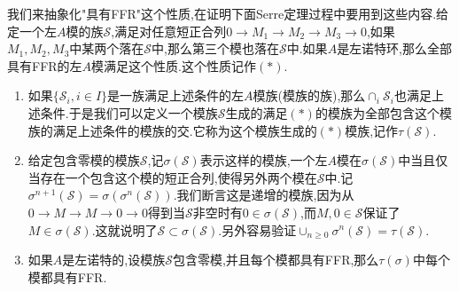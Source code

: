 我们来抽象化"具有FFR"这个性质,在证明下面Serre定理过程中要用到这些内容.给定一个左$A$模的族$\mathscr{S}$,满足对任意短正合列$0\to M_1\to M_2\to M_3\to0$,如果$M_1,M_2,M_3$中某两个落在$\mathscr{S}$中,那么第三个模也落在$\mathscr{S}$中.如果$A$是左诺特环,那么全部具有FFR的左$A$模满足这个性质.这个性质记作$(\ast)$.
\begin{enumerate}
	\item 如果$\{\mathscr{S}_i,i\in I\}$是一族满足上述条件的左$A$模族(模族的族),那么$\cap_i\mathscr{S}_i$也满足上述条件.于是我们可以定义一个模族$\mathscr{S}$生成的满足$(\ast)$的模族为全部包含这个模族的满足上述条件的模族的交.它称为这个模族生成的$(\ast)$模族,记作$\tau(\mathscr{S})$.
	\item 给定包含零模的模族$\mathscr{S}$,记$\sigma(\mathscr{S})$表示这样的模族,一个左$A$模在$\sigma(\mathscr{S})$中当且仅当存在一个包含这个模的短正合列,使得另外两个模在$\mathscr{S}$中.记$\sigma^{n+1}(\mathscr{S})=\sigma(\sigma^n(\mathscr{S}))$.我们断言这是递增的模族,因为从$0\to M\to M\to0\to0$得到当$\mathscr{S}$非空时有$0\in\sigma(\mathscr{S})$,而$M,0\in\mathscr{S}$保证了$M\in\sigma(\mathscr{S})$.这就说明了$\mathscr{S}\subset\sigma(\mathscr{S})$.另外容易验证$\cup_{n\ge0}\sigma^n(\mathscr{S})=\tau(\mathscr{S})$.
	\item 如果$A$是左诺特的,设模族$\mathscr{S}$包含零模,并且每个模都具有FFR,那么$\tau(\sigma)$中每个模都具有FFR.
\end{enumerate}

